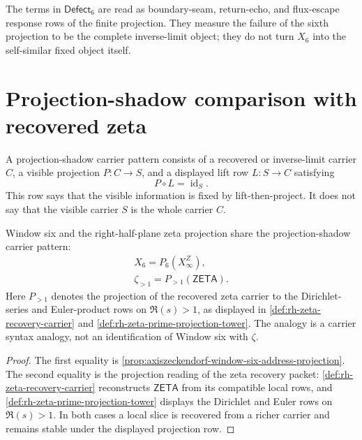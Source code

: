 \begin{principle}
\label{prin:axiszeckendorf-finite-shadow-not-complete-closure}
The terms in $\mathsf{Defect}_6$ are read as boundary-seam, return-echo, and
flux-escape response rows of the finite projection.  They measure the
failure of the sixth projection to be the complete inverse-limit object;
they do not turn $X_6$ into the self-similar fixed object itself.
\end{principle}

\section{Projection-shadow comparison with recovered zeta}
\label{sec:axiszeckendorf-zeta-projection-shadow-comparison}

\begin{definition}
\label{def:axiszeckendorf-projection-shadow-carrier-pattern}
A projection-shadow carrier pattern consists of a recovered or inverse-limit
carrier $C$, a visible projection $P:C\to S$, and a displayed lift row
$L:S\to C$ satisfying
$$
P\circ L=\operatorname{id}_S.
$$
This row says that the visible information is fixed by lift-then-project.
It does not say that the visible carrier $S$ is the whole carrier $C$.
\end{definition}

\begin{proposition}
\label{prop:axiszeckendorf-window-zeta-projection-shadow-comparison}
Window six and the right-half-plane zeta projection share the
projection-shadow carrier pattern:
$$
\begin{gathered}
X_6=P_6(X_\infty^Z),\\
\zeta_{>1}=P_{>1}(\mathsf{ZETA}).
\end{gathered}
$$
Here $P_{>1}$ denotes the projection of the recovered zeta carrier to the
Dirichlet-series and Euler-product rows on $\Re(s)>1$, as displayed in
\autoref{def:rh-zeta-recovery-carrier} and
\autoref{def:rh-zeta-prime-projection-tower}.  The analogy is a carrier
syntax analogy, not an identification of Window six with $\zeta$.
\end{proposition}

\begin{proof}
The first equality is \autoref{prop:axiszeckendorf-window-six-address-projection}.
The second equality is the projection reading of the zeta recovery packet:
\autoref{def:rh-zeta-recovery-carrier} reconstructs $\mathsf{ZETA}$ from its
compatible local rows, and
\autoref{def:rh-zeta-prime-projection-tower} displays the Dirichlet and Euler
rows on $\Re(s)>1$.  In both cases a local slice is recovered from a richer
carrier and remains stable under the displayed projection row.
\end{proof}

